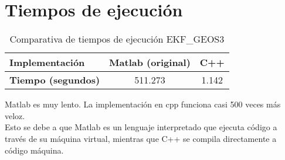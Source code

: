 \documentclass[12pt,a4paper]{article}
\begin{document}
\section{Tiempos de ejecución}

\begin{table}[H]
\centering
\begin{tabular}{|l|c|c|}
\hline
Implementación & Matlab (original) & C++ \\
\hline
\textbf{Tiempo (segundos)} & 511.273 & 1.142 \\
\hline
\end{tabular}
\caption{Comparativa de tiempos de ejecución EKF\_GEOS3}
\label{tab:tiempos}
\end{table}
Matlab es muy lento. La implementación en cpp funciona casi 500 veces más veloz.
\\Esto se debe a que Matlab es un lenguaje interpretado que ejecuta código a través de su máquina virtual, mientras que C++ se compila directamente a código máquina.
\end{document}
